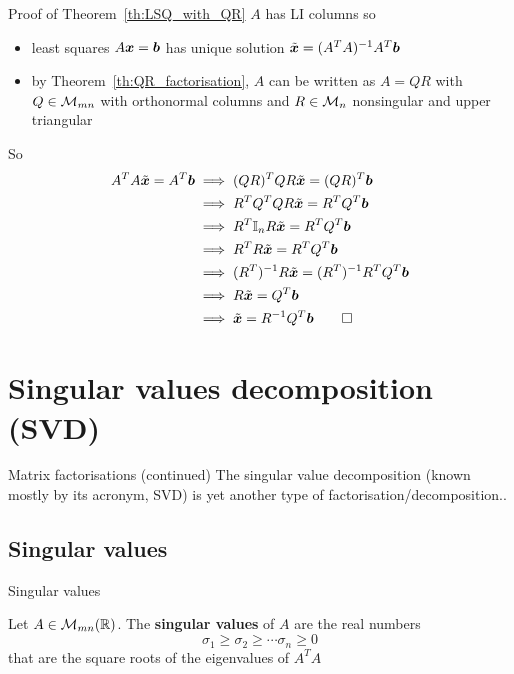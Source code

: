 \documentclass[aspectratio=169]{beamer}\usepackage[]{graphicx}\usepackage[]{xcolor}
\begin{document}
\begin{frame}{Proof of Theorem~\ref{th:LSQ_with_QR}}
$A$ has LI columns so 
\begin{itemize}
\item least squares $A\bm{x}=\bm{b}$ has unique solution $\tilde{\bm{x}}=(A^TA)^{-1}A^T\bm{b}$
\item by Theorem~\ref{th:QR_factorisation}, $A$ can be written as $A=QR$ with $Q\in\mathcal{M}_{mn}$ with orthonormal columns and $R\in\mathcal{M}_n$ nonsingular and upper triangular
\end{itemize}
So
\begin{align*}
A^TA\tilde\bx= A^T\bb &\implies (QR)^TQR\tilde\bx = (QR)^T\bb \\
&\implies R^TQ^TQR\tilde\bx = R^TQ^T\bb \\
&\implies R^T\II_nR\tilde\bx = R^TQ^T\bb \\
&\implies R^TR\tilde\bx = R^TQ^T\bb \\
&\implies (R^T)^{-1}R\tilde\bx = (R^T)^{-1}R^TQ^T\bb \\
&\implies R\tilde\bx = Q^T\bb \\
&\implies \tilde\bx = R^{-1}Q^T\bb\hfill\qed
\end{align*}
\end{frame}



\section{Singular values decomposition (SVD)}

\begin{frame}{Matrix factorisations (continued)}
The singular value decomposition (known mostly by its acronym, SVD) is yet another type of factorisation/decomposition..
\end{frame}

\subsection{Singular values}

\begin{frame}{Singular values}
\begin{definition}
Let $A\in\mathcal{M}_{mn}(\mathbb{R})$. The \textbf{singular values} of $A$ are the real numbers 
\[
\sigma_1\geq \sigma_2\geq\cdots\sigma_n\geq 0
\]
that are the square roots of the eigenvalues of $A^TA$
\end{definition}
\end{frame}
\end{document}
